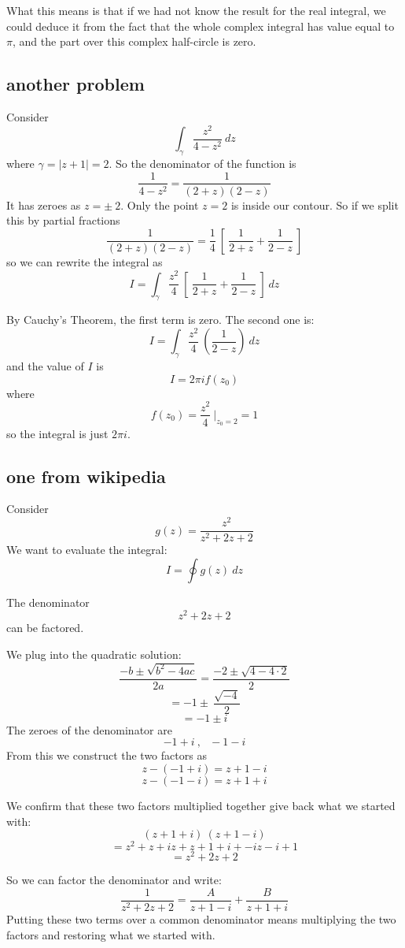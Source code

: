 \documentclass[11pt, oneside]{article}   	%
\begin{document}
What this means is that if we had not know the result for the real integral, we could deduce it from the fact that the whole complex integral has value equal to $\pi$, and the part over this complex half-circle is zero.

\subsection*{another problem}

Consider
\[ \int_{\gamma} \frac{z^2}{4-z^2} \ dz \]
where $\gamma = | z + 1 | = 2$.
So the denominator of the function is
\[ \frac{1}{4-z^2} = \frac{1}{(2+z)(2-z)} \]
It has zeroes as $z = \pm \ 2$.  Only the point $z = 2$ is inside our contour.  So if we split this by partial fractions
\[  \frac{1}{(2+z)(2-z)} = \frac{1}{4} \ [ \ \frac{1}{2+z} + \frac{1}{2-z} \ ] \]
so we can rewrite the integral as
\[ I = \int_{\gamma} \frac{z^2}{4} \ [ \ \frac{1}{2+z} + \frac{1}{2-z} \ ] \ dz \]

By Cauchy's Theorem, the first term is zero.  The second one is:
\[ I = \int_{\gamma} \frac{z^2}{4} \ ( \frac{1}{2-z} ) \ dz \]
and the value of $I$ is
\[ I = 2 \pi i f(z_0) \]
where 
\[ f(z_0) = \frac{z^2}{4}  \ \bigg |_{z_0 = 2} = 1 \]
so the integral is just $2 \pi i$.

\subsection*{one from wikipedia}
Consider
\[ g(z) = \frac{z^2}{z^2 + 2z + 2} \]
We want to evaluate the integral:
\[ I = \oint g(z) \ dz \]

The denominator
\[ z^2 + 2z + 2 \]
can be factored.

We plug into the quadratic solution:
\[ \frac{-b \pm \sqrt{b^2 - 4ac}}{2a} =  \frac{-2 \pm \sqrt{4 - 4 \cdot 2}}{2} \]
\[ = -1 \pm \  \frac{\sqrt{-4}}{2} \]
\[ = -1 \pm i \]
The zeroes of the denominator are
\[ - 1 + i \ , \ \ \ - 1 - i \]
From this we construct the two factors as
\[ z - (- 1 + i) = z + 1 - i \]
\[ z - (-1 - i) = z + 1 + i \]

We confirm that these two factors multiplied together give back what we started with:
\[ (z + 1 + i) \ (z + 1 - i) \]
\[ = z^2 + z + iz + z + 1 + i + -iz - i + 1 \] 
\[ = z^2 + 2z + 2 \]

So we can factor the denominator and write:
\[ \frac{1}{z^2 + 2z + 2} = \frac{A}{z + 1 - i} + \frac{B}{z + 1 + i}  \]
Putting these two terms over a common denominator means multiplying the two factors and restoring what we started with.
\end{document}
